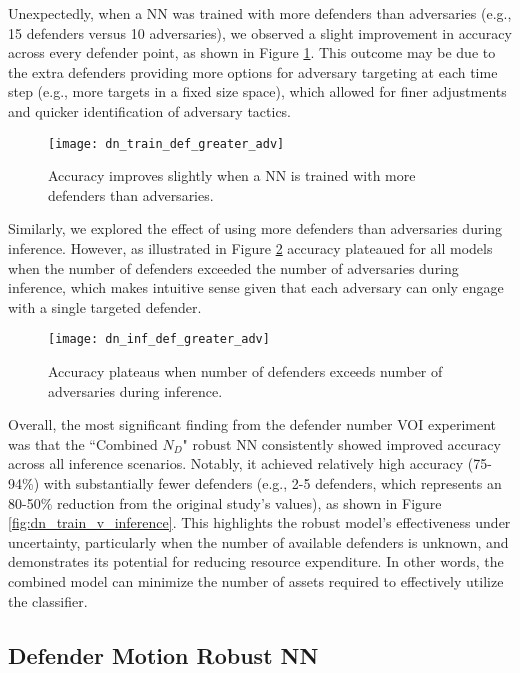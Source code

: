 \documentclass[journal]{IEEEtran} %
\begin{document}
Unexpectedly, when a NN was trained with more defenders than adversaries (e.g., 15 defenders versus 10 adversaries), we observed a slight improvement in accuracy across every defender point, as shown in Figure \ref{fig:dn_train_def_greater_adv}. This outcome may be due to the extra defenders providing more options for adversary targeting at each time step (e.g., more targets in a fixed size space), which allowed for finer adjustments and quicker identification of adversary tactics.

\begin{figure}[h]
    \centering
    \texttt{[image: dn\_train\_def\_greater\_adv]}
    \caption{Accuracy improves slightly when a NN is trained with more defenders than adversaries.}
    \label{fig:dn_train_def_greater_adv}
\end{figure}

Similarly, we explored the effect of using more defenders than adversaries during inference. However, as illustrated in Figure \ref{fig:dn_inf_def_greater_adv} accuracy plateaued for all models when the number of defenders exceeded the number of adversaries during inference, which makes intuitive sense given that each adversary can only engage with a single targeted defender.

\begin{figure}[h]
    \centering
    \texttt{[image: dn\_inf\_def\_greater\_adv]}
    \caption{Accuracy plateaus when number of defenders exceeds number of adversaries during inference.}
    \label{fig:dn_inf_def_greater_adv}
\end{figure}

Overall, the most significant finding from the defender number VOI experiment was that the ``Combined $N_D$" robust NN consistently showed improved accuracy across all inference scenarios. Notably, it achieved relatively high accuracy (75-94\%) with substantially fewer defenders (e.g., 2-5 defenders, which represents an 80-50\% reduction from the original study's values), as shown in Figure \ref{fig:dn_train_v_inference}. This highlights the robust model's effectiveness under uncertainty, particularly when the number of available defenders is unknown, and demonstrates its potential for reducing resource expenditure. In other words, the combined model can minimize the number of assets required to effectively utilize the classifier.


\subsection{Defender Motion Robust NN}
\label{sec:results_DM}
\end{document}
